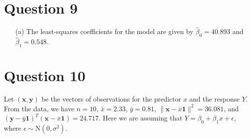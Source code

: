 \documentclass[10pt]{article}
\begin{document}
\section{Question 9} \noindent
\begin{itemize}
    \item[(a)] The least-squares coefficients for the model are given by \(\hat{\beta}_0 = 40.893\) and \(\hat{\beta}_1 = 0.548\).
\end{itemize}

\section{Question 10} \noindent
Let \((\mathbf{x}, \mathbf{y})\) be the vectors of observations for the predictor \(x\) and the response \(Y\). 
From the data, we have \(n = 10\), \(\bar{x} = 2.33\), \(\bar{y} = 0.81\), \(\| \mathbf{x} - \bar{x}\mathbf{1} \|^2 = 36.081\), and 
\((\mathbf{y} - \bar{y}\mathbf{1})^T(\mathbf{x} - \bar{x}\mathbf{1}) = 24.717\).
Here we are assuming that \(Y = \beta_0 + \beta_1 x + \epsilon\), where \(\epsilon \sim \mathrm{N}(0, \sigma^2)\).
\end{document}
